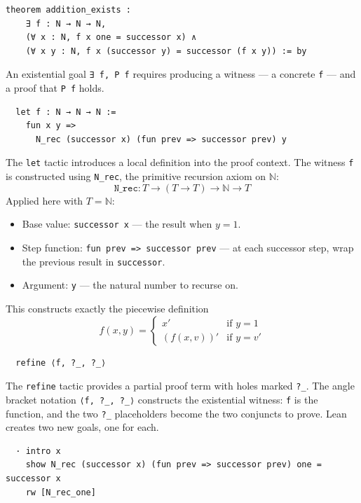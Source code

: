 \begin{verbatim}
theorem addition_exists :
    ∃ f : N → N → N,
    (∀ x : N, f x one = successor x) ∧
    (∀ x y : N, f x (successor y) = successor (f x y)) := by
\end{verbatim}

\noindent
An existential goal \verb|∃ f, P f| requires producing a witness ---
a concrete \verb|f| --- and a proof that \verb|P f| holds.

\begin{verbatim}
  let f : N → N → N :=
    fun x y =>
      N_rec (successor x) (fun prev => successor prev) y
\end{verbatim}

\noindent
The \verb|let| tactic introduces a local definition into the proof
context. The witness \verb|f| is constructed using \verb|N_rec|, the
primitive recursion axiom on $\mathbb{N}$:
\[
  \mathtt{N\_rec} : T \to (T \to T) \to \mathbb{N} \to T
\]
Applied here with $T = \mathbb{N}$:
\begin{itemize}
  \item Base value: \verb|successor x| --- the result when $y = 1$.
  \item Step function: \verb|fun prev => successor prev| --- at each
        successor step, wrap the previous result in \verb|successor|.
  \item Argument: \verb|y| --- the natural number to recurse on.
\end{itemize}
This constructs exactly the piecewise definition
\[
  f(x, y) = \begin{cases} x' & \text{if } y = 1 \\ (f(x,v))' & \text{if } y = v' \end{cases}
\]

\begin{verbatim}
  refine ⟨f, ?_, ?_⟩
\end{verbatim}

\noindent
The \verb|refine| tactic provides a partial proof term with holes marked
\verb|?_|. The angle bracket notation \verb|⟨f, ?_, ?_⟩| constructs the
existential witness: \verb|f| is the function, and the two \verb|?_|
placeholders become the two conjuncts to prove. Lean creates two new
goals, one for each.

\begin{verbatim}
  · intro x
    show N_rec (successor x) (fun prev => successor prev) one = successor x
    rw [N_rec_one]
\end{verbatim}

